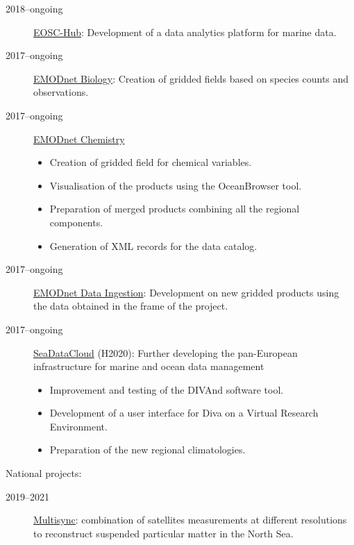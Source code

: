 \documentclass[10pt,a4paper,svgnames]{article}
\begin{document}
\begin{description}
\begin{description}

\item[2018--ongoing] \href{https://www.eosc-hub.eu}{EOSC-Hub}: Development of a data analytics platform for marine data.

\item[2017--ongoing] \href{https://emodnet-biology.eu}{EMODnet Biology}: Creation of gridded fields based on species counts and observations.

\item[2017--ongoing] \href{https://www.emodnet-chemistry.eu}{EMODnet Chemistry} 
\begin{itemize}
\item Creation of gridded field for chemical variables.
\item Visualisation of the products using the OceanBrowser tool.
\item Preparation of merged products combining all the regional components.
\item Generation of XML records for the data catalog.
\end{itemize}

\item[2017--ongoing] \href{https://www.emodnet-ingestion.eu}{EMODnet Data Ingestion}: Development on new gridded products using the data obtained in the frame of the project.

\item[2017--ongoing] \href{https://www.seadatanet.org}{SeaDataCloud} (H2020): Further developing the pan-European infrastructure for marine and ocean data management
\begin{itemize}
\item Improvement and testing of the DIVAnd software tool.
\item Development of a user interface for Diva on a Virtual Research Environment.
\item Preparation of the new regional climatologies.
\end{itemize}

\end{description}
National projects:
\begin{description}
\item[2019--2021] \href{https://odnature.naturalsciences.be/multi-sync/en/}{Multisync}: combination of satellites measurements at different resolutions to reconstruct suspended particular matter in the North Sea.
\end{description}


\end{description}
\end{document}
